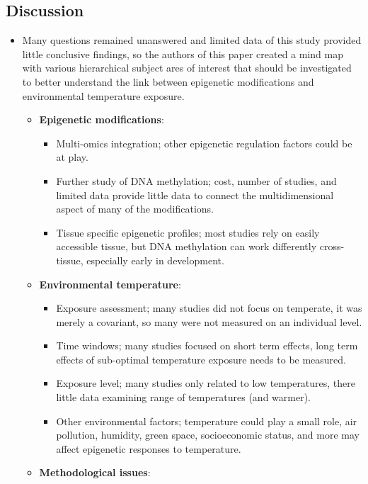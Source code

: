\documentclass[basic]{inVerba-notes}
\begin{document}
\begin{itemize}
\subsection{Discussion}
\begin{itemize}
    \item Many questions remained unanswered and limited data of this study provided little conclusive findings, so the authors of this paper created a mind map with various hierarchical subject ares of interest that should be investigated to better understand the link between epigenetic modifications and environmental temperature exposure.
      \begin{itemize}
        \item \textbf{Epigenetic modifications}:
          \begin{itemize}
            \item Multi-omics integration; other epigenetic regulation factors could be at play.
            \item Further study of DNA methylation; cost, number of studies, and limited data provide little data to connect the multidimensional aspect of many of the modifications.
            \item Tissue specific epigenetic profiles; most studies rely on easily accessible tissue, but DNA methylation can work differently cross-tissue, especially early in development. 
          \end{itemize}
        \item \textbf{Environmental temperature}:
          \begin{itemize}
            \item Exposure assessment; many studies did not focus on temperate, it was merely a covariant, so many were not measured on an individual level.
            \item Time windows; many studies focused on short term effects, long term effects of sub-optimal temperature exposure needs to be measured.
            \item Exposure level; many studies only related to low temperatures, there little data examining range of temperatures (and warmer).
            \item Other environmental factors; temperature could play a small role, air pollution, humidity, green space, socioeconomic status, and more may affect epigenetic responses to temperature.
          \end{itemize}
        \item \textbf{Methodological issues}:

\end{itemize}
\end{itemize}
\end{itemize}
\end{document}
